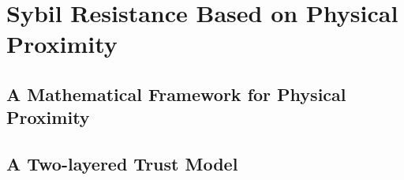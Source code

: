 \chapter{Sybil Resistance Based on Physical Proximity}
\label{chap:Sybil Resistance Based on Physical Proximity}



\section{A Mathematical Framework for Physical Proximity}
\label{sec:A Mathematical Framework for Physical Proximity}



\section{A Two-layered Trust Model}
\label{sec:A Two-layered Trust Model}

